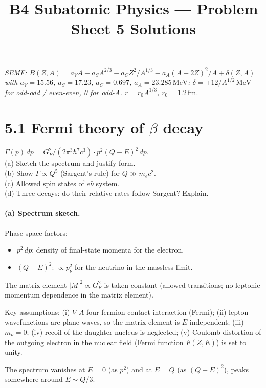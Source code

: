 \documentclass[11pt]{article}
\title{B4 Subatomic Physics --- Problem Sheet 5 Solutions}
\author{}
\date{}
\newcommand{\Q}[1]{\begin{question}#1\end{question}}
\newcommand{\fm}{\,\mathrm{fm}}
\newcommand{\MeV}{\,\mathrm{MeV}}
\begin{document}
\maketitle

\noindent\textit{SEMF: $B(Z,A)=a_V A-a_S A^{2/3}-a_C Z^{2}/A^{1/3}-a_A(A-2Z)^{2}/A+\delta(Z,A)$ with $a_V=15.56$, $a_S=17.23$, $a_C=0.697$, $a_A=23.285\MeV$; $\delta=\mp 12/A^{1/2}\MeV$ for odd-odd / even-even, 0 for odd-$A$. $r=r_0 A^{1/3}$, $r_0=1.2\fm$.}

\section*{5.1 \quad Fermi theory of $\beta$ decay}

\Q{$\Gamma(p)\,dp=G_F^{2}/(2\pi^{3}\hbar^{7}c^{3})\cdot p^{2}(Q-E)^{2}\,dp$.\\
(a) Sketch the spectrum and justify form.\\
(b) Show $\Gamma\propto Q^{5}$ (Sargent's rule) for $Q\gg m_e c^{2}$.\\
(c) Allowed spin states of $e\bar\nu$ system.\\
(d) Three decays: do their relative rates follow Sargent? Explain.}

\paragraph{(a) Spectrum sketch.} Phase-space factors:
\begin{itemize}[itemsep=1pt]
\item $p^{2}\,dp$: density of final-state momenta for the electron.
\item $(Q-E)^{2}$: $\propto p_\nu^{2}$ for the neutrino in the massless limit.
\end{itemize}
The matrix element $|M|^{2}\propto G_F^{2}$ is taken constant (allowed transitions; no leptonic momentum dependence in the matrix element).

Key assumptions: (i) $V$-$A$ four-fermion contact interaction (Fermi); (ii) lepton wavefunctions are plane waves, so the matrix element is $E$-independent; (iii) $m_\nu=0$; (iv) recoil of the daughter nucleus is neglected; (v) Coulomb distortion of the outgoing electron in the nuclear field (Fermi function $F(Z,E)$) is set to unity.

\begin{center}
\end{center}
The spectrum vanishes at $E=0$ (as $p^{2}$) and at $E=Q$ (as $(Q-E)^{2}$), peaks somewhere around $E\sim Q/3$.
\end{document}
